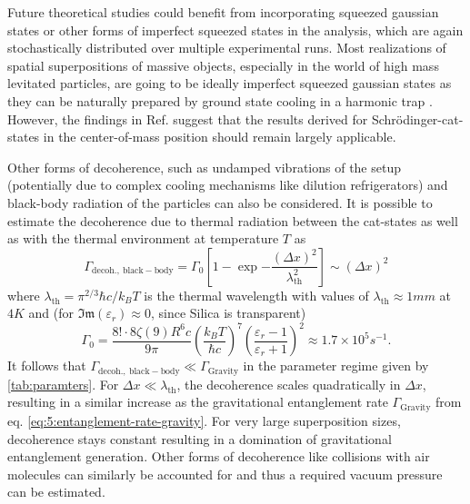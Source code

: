 Future theoretical studies could benefit from incorporating squeezed gaussian states \cite[p. 33-64]{Serafini_2017} or other forms of imperfect squeezed states in the analysis, which are again stochastically distributed over multiple experimental runs.
Most realizations of spatial superpositions of massive objects, especially in the world of high mass levitated particles, are going to be ideally imperfect squeezed gaussian states \cite[Timestamp: 23:00]{Aspelmeyer_2024} as they can be naturally prepared by ground state cooling in a harmonic trap \cite{Weiss_2021}.
However, the findings in Ref. \cite{Pedernales_2023} suggest that the results derived for Schrödinger-cat-states in the center-of-mass position should remain largely applicable.

Other forms of decoherence, such as undamped vibrations of the setup (potentially due to complex cooling mechanisms like dilution refrigerators) and black-body radiation of the particles can also be considered.
It is possible to estimate the decoherence due to thermal radiation \cite[p. 127-136]{Schlosshauer_2007} between the cat-states as well as with the thermal environment at temperature $T$ as \cite{RomeroIsart_2011}
\begin{equation}
  \Gamma_\mathrm{decoh.,\ black-body} = \Gamma_0\left[1 - \exp{-\frac{(\Delta x)^2}{\lambda^2_\mathrm{th}}}\right] \sim (\Delta x)^2
\end{equation}
where $\lambda_\mathrm{th} = \pi^{2/3} \hbar c / k_B T$ is the thermal wavelength with values of $\lambda_\mathrm{th} \approx 1\si{mm}$ at $4\si{K}$ and (for $\mathfrak{Im}(\varepsilon_r)\approx 0$, since Silica is transparent)
\begin{equation}
  \Gamma_0 = \frac{8! \cdot 8 \zeta(9)R^6c}{9\pi} \left(\frac{k_B T}{\hbar c}\right)^7 \left(\frac{\varepsilon_r - 1}{\varepsilon_r + 1}\right)^2 \approx 1.7 \times 10^{5} \si{s^{-1}} .
\end{equation}
It follows that $\Gamma_\mathrm{decoh.,\ black-body} \ll \Gamma_\mathrm{Gravity}$ in the parameter regime given by \cref{tab:paramters}.
For $\Delta x \ll \lambda_\mathrm{th}$, the decoherence scales quadratically in $\Delta x$, resulting in a similar increase as the gravitational entanglement rate $\Gamma_\mathrm{Gravity}$ from eq. \eqref{eq:5:entanglement-rate-gravity}.
For very large superposition sizes, decoherence stays constant resulting in a domination of gravitational entanglement generation.
Other forms of decoherence like collisions with air molecules can similarly be accounted for and thus a required vacuum pressure can be estimated.


